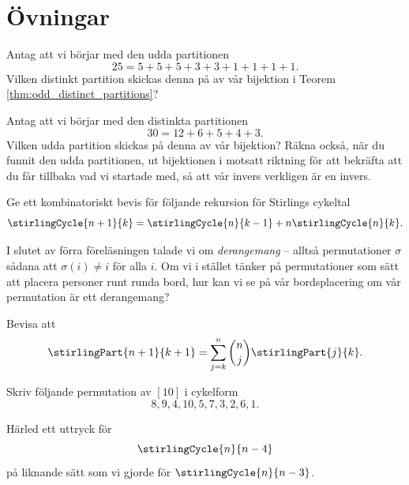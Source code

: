 \documentclass[nobib]{tufte-handout}
\begin{document}
\section{Övningar}

\begin{xca}
  Antag att vi börjar med den udda partitionen
  $$25 = 5 + 5 + 5 + 3 + 3 + 1 + 1 + 1 + 1.$$
  Vilken distinkt partition skickas denna på av vår bijektion i Teorem \ref{thm:odd_distinct_partitions}?

  Antag att vi börjar med den distinkta partitionen
  $$30 = 12 + 6 + 5 + 4 + 3.$$
  Vilken udda partition skickas på denna av vår bijektion? Räkna också, när du funnit den udda partitionen, ut bijektionen i motsatt riktning för att bekräfta att du får tillbaka vad vi startade med, så att vår invers verkligen är en invers.
\end{xca}

\begin{xca}
  Ge ett kombinatoriskt bevis för följande rekursion för Stirlings cykeltal
  $$\stirlingCycle{n+1}{k} = \stirlingCycle{n}{k-1} + n\stirlingCycle{n}{k}.$$
\end{xca}

\begin{xca}
  I slutet av förra föreläsningen talade vi om \emph{derangemang} -- alltså permutationer $\sigma$ sådana att $\sigma(i) \neq i$ för alla $i$. Om vi i stället tänker på permutationer som sätt att placera personer runt runda bord, hur kan vi se på vår bordsplacering om vår permutation är ett derangemang?
\end{xca}

\begin{xca}
  Bevisa att
  $$\stirlingPart{n+1}{k+1} = \sum_{j=k}^{n} \binom{n}{j}\stirlingPart{j}{k}.$$
\end{xca}

\begin{xca}
  Skriv följande permutation av $[10]$ i cykelform
  $$8, 9, 4, 10, 5, 7, 3, 2, 6, 1.$$
\end{xca}

\begin{xca}
  Härled ett uttryck för
  $$\stirlingCycle{n}{n-4}$$
  på liknande sätt som vi gjorde för $\stirlingCycle{n}{n-3}$.
\end{xca}

%
%
\end{document}
